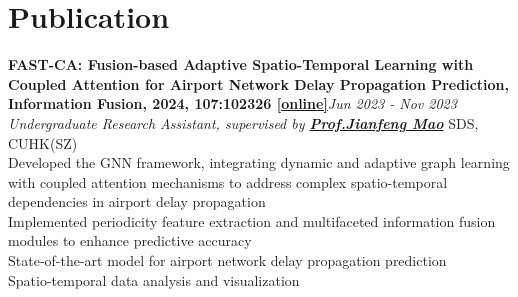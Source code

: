 \documentclass[a4paper,8pt]{article}
\begin{document}
\section*{Publication}
\textbf{FAST-CA: Fusion-based Adaptive Spatio-Temporal Learning with Coupled Attention for Airport Network Delay Propagation Prediction, Information Fusion, 2024, 107:102326 \href{https://www.sciencedirect.com/science/article/pii/S1566253524001040}{[online]}}\hfill \textit{Jun 2023 - Nov 2023}\\
\textit{Undergraduate Research Assistant, supervised by \textbf{\href{https://sds.cuhk.edu.cn/en/teacher/268}{Prof.\@ Jianfeng Mao}}} \hfill SDS, CUHK(SZ)\\
\textbullet Developed the GNN framework, integrating dynamic and adaptive graph learning with coupled attention mechanisms to address complex spatio-temporal dependencies in airport delay propagation\\
\textbullet Implemented periodicity feature extraction and multifaceted information fusion modules to enhance predictive accuracy\\
\textbullet State-of-the-art model for airport network delay propagation prediction\\
\textbullet Spatio-temporal data analysis and visualization
\end{document}
